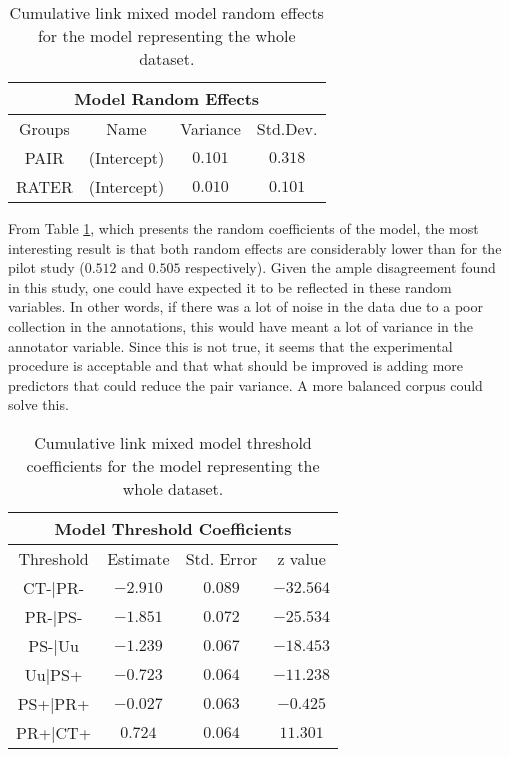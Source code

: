 \begin{table}
\center
\begin{tabular}{|c|c|c|c|}
\hline
\multicolumn{4}{|c|}{Model Random Effects}\\\hline
Groups  &  Name       &  Variance & Std.Dev.\\\hline
 PAIR  & (Intercept) & $0.101$ &$0.318$\\\hline  
 RATER & (Intercept) & $0.010$ &$0.101$\\\hline  
\end{tabular}
\caption[Model Random Effects.]{Cumulative link mixed model random effects for the model representing the whole dataset.}
\label{tab:modrand}
\end{table}

From Table \ref{tab:modrand}, which presents the random coefficients of the model, the most interesting result is that both random effects are considerably lower than for the pilot study ($0.512$ and $0.505$ respectively). Given the ample disagreement found in this study, one could have expected it to be reflected in these random variables. In other words, if there was a lot of noise in the data due to a poor collection in the annotations, this would have meant a lot of variance in the annotator variable. Since this is not true, it seems that the experimental procedure is acceptable and that what should be improved is adding more predictors that could reduce the pair variance. A more balanced corpus could solve this.\\ 

\begin{table}
\center
\begin{tabular}{|c|c|c|c|}
\hline
\multicolumn{4}{|c|}{Model Threshold Coefficients}\\\hline
Threshold &  Estimate & Std. Error & z value\\\hline
CT-|PR- &$-2.910$ &$0.089$ &$-32.564$\\\hline
PR-|PS- &$-1.851$ &$0.072$ &$-25.534$\\\hline
PS-|Uu  &$-1.239$ &$0.067$ &$-18.453$\\\hline
Uu|PS+  &$-0.723$ &$0.064$ &$-11.238$\\\hline
PS+|PR+ &$-0.027$ &$0.063$ &$ -0.425$\\\hline
PR+|CT+ &$ 0.724$ &$0.064$ &$ 11.301$\\\hline
\end{tabular}
\caption[Model Threshold Coefficients.]{Cumulative link mixed model threshold coefficients for the model representing the whole dataset.}
\label{tab:modthres}
\end{table}

